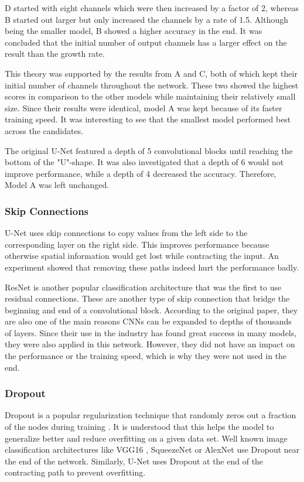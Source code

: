 D started with eight channels which were then increased by a factor of 2, whereas B started out larger but only increased the channels by a rate of 1.5. Although being the smaller model, B showed a higher accuracy in the end. It was concluded that the initial number of output channels has a larger effect on the result than the growth rate.

This theory was supported by the results from A and C, both of which kept their initial number of channels throughout the network. These two showed the highest scores in comparison to the other models while maintaining their relatively small size. Since their results were identical, model A was kept because of its faster training speed. It was interesting to see that the smallest model performed best across the candidates.

The original U-Net featured a depth of 5 convolutional blocks until reaching the bottom of the "U"-shape. It was also investigated that a depth of 6 would not improve performance, while a depth of 4 decreased the accuracy. Therefore, Model A was left unchanged.

\subsubsection{Skip Connections}

U-Net uses skip connections to copy values from the left side to the corresponding layer on the right side. This improves performance because otherwise spatial information would get lost while contracting the input. An experiment showed that removing these paths indeed hurt the performance badly.

ResNet \cite{He2015b} is another popular classification architecture that was the first to use residual connections. These are another type of skip connection that bridge the beginning and end of a convolutional block. According to the original paper, they are also one of the main reasons CNNs can be expanded to depths of thousands of layers. Since their use in the industry has found great success in many models, they were also applied in this network. However, they did not have an impact on the performance or the training speed, which is why they were not used in the end.

\subsubsection{Dropout}

Dropout is a popular regularization technique that randomly zeros out a fraction of the nodes during training \cite{Srivastava2014}. It is understood that this helps the model to generalize better and reduce overfitting on a given data set. Well known image classification architectures like VGG16 \cite{Simonyan2014a}, SqueezeNet \cite{Iandola2016a} or AlexNet \cite{Krizhevsky} use Dropout near the end of the network. Similarly, U-Net uses Dropout at the end of the contracting path to prevent overfitting.

